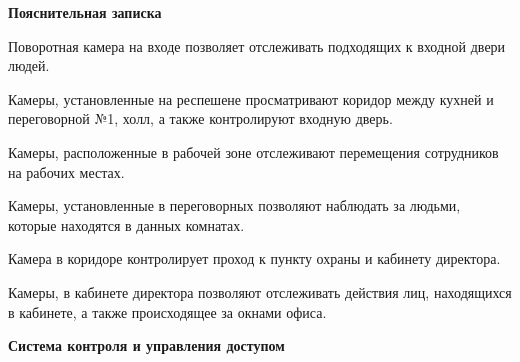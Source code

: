\documentclass[a4paper,14pt]{extarticle}
\begin{document}
    \textbf{Пояснительная записка}
    \begin{spacing}{1.25}
        Поворотная камера на входе позволяет отслеживать подходящих к входной двери людей.

        Камеры, установленные на респешене просматривают коридор между кухней и переговорной №1, холл, а также контролируют входную дверь.

        Камеры, расположенные в рабочей зоне отслеживают перемещения сотрудников на рабочих местах. 

        Камеры, установленные в переговорных позволяют наблюдать за людьми, которые находятся в данных комнатах.

        Камера в коридоре контролирует проход к пункту охраны и кабинету директора.

        Камеры, в кабинете директора позволяют отслеживать действия лиц, находящихся в кабинете, а также происходящее за окнами офиса. 
    \end{spacing}

    \newpage
    \textbf{\large{Система контроля и управления доступом}}
\end{document}
